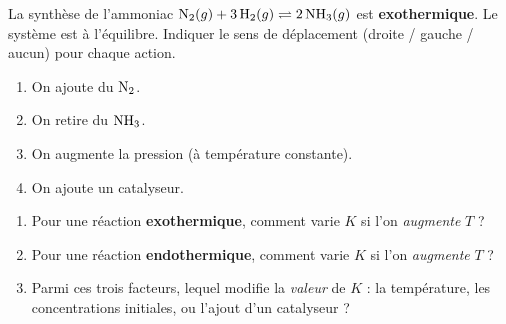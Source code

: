 \documentclass[11pt,a4paper]{article}
\begin{document}
\begin{exercice}
La synthèse de l'ammoniac \;$\ce{N2}(g) + 3\,\ce{H2}(g) \rightleftharpoons 2\,\ce{NH3}(g)$\; est
\textbf{exothermique}. Le système est à l'équilibre. Indiquer le sens de déplacement (droite / gauche /
aucun) pour chaque action.
\begin{enumerate}[label=\alph*),leftmargin=2em,topsep=2pt,itemsep=2pt]
  \item On ajoute du $\ce{N2}$.
  \item On retire du $\ce{NH3}$.
  \item On augmente la pression (à température constante).
  \item On ajoute un catalyseur.
\end{enumerate}
\end{exercice}

\begin{exercice}
\begin{enumerate}[label=\alph*),leftmargin=2em,topsep=2pt,itemsep=2pt]
  \item Pour une réaction \textbf{exothermique}, comment varie $K$ si l'on \emph{augmente} $T$ ?
  \item Pour une réaction \textbf{endothermique}, comment varie $K$ si l'on \emph{augmente} $T$ ?
  \item Parmi ces trois facteurs, lequel modifie la \emph{valeur} de $K$ : la température, les concentrations
        initiales, ou l'ajout d'un catalyseur ?
\end{enumerate}
\end{exercice}
\end{document}
